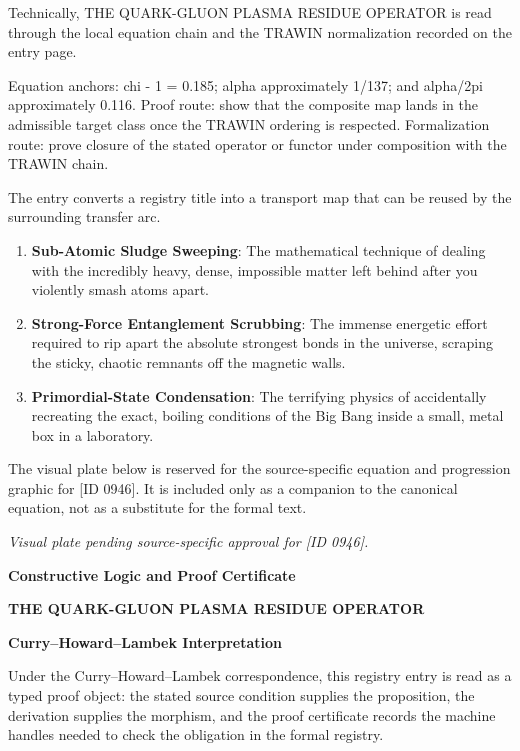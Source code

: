 Technically, THE QUARK-GLUON PLASMA RESIDUE OPERATOR is read through the local equation chain and the TRAWIN normalization recorded on the entry page.

Equation anchors: chi - 1 = 0.185; alpha approximately 1/137; and alpha/2pi approximately 0.116. Proof route: show that the composite map lands in the admissible target class once the TRAWIN ordering is respected. Formalization route: prove closure of the stated operator or functor under composition with the TRAWIN chain.

The entry converts a registry title into a transport map that can be reused by the surrounding transfer arc.
\endgroup

\begin{enumerate}[leftmargin=1.6em,itemsep=6pt,topsep=4pt]
\item \textbf{Sub-Atomic Sludge Sweeping}: The mathematical technique of dealing with the incredibly heavy, dense, impossible matter left behind after you violently smash atoms apart.
\item \textbf{Strong-Force Entanglement Scrubbing}: The immense energetic effort required to rip apart the absolute strongest bonds in the universe, scraping the sticky, chaotic remnants off the magnetic walls.
\item \textbf{Primordial-State Condensation}: The terrifying physics of accidentally recreating the exact, boiling conditions of the Big Bang inside a small, metal box in a laboratory.
\end{enumerate}

\begingroup\footnotesize\sloppy
The visual plate below is reserved for the source-specific equation and progression graphic for [ID 0946]. It is included only as a companion to the canonical equation, not as a substitute for the formal text.
\par\endgroup
\begingroup\footnotesize\itshape
Visual plate pending source-specific approval for [ID 0946].
\par\endgroup

\clearpage
\begingroup\tzpsupportsetup
\noindent\textbf{\fontsize{10.8pt}{12.8pt}\selectfont [ID 0946] Constructive Logic and Proof Certificate}\par
\noindent\textbf{\fontsize{10pt}{12pt}\selectfont THE QUARK-GLUON PLASMA RESIDUE OPERATOR}\par
\vspace{0.45em}
\begingroup
\footnotesize
\setlength{\parskip}{0.22em}
\setlength{\parindent}{0pt}
\noindent\textbf{Curry--Howard--Lambek Interpretation}\par
Under the Curry--Howard--Lambek correspondence, this registry entry is read as a typed proof
object: the stated source condition supplies the proposition, the derivation supplies the
morphism, and the proof certificate records the machine handles needed to check the obligation
in the formal registry.

